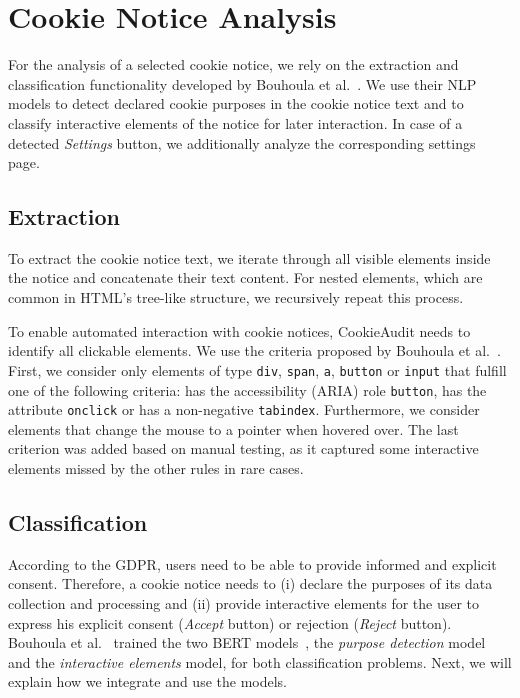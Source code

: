 \section{Cookie Notice Analysis}
For the analysis of a selected cookie notice, we rely on the extraction and classification functionality developed by Bouhoula et al.~\cite{bouhoula2023automated}.
We use their NLP models to detect declared cookie purposes in the cookie notice text and to classify interactive elements of the notice for later interaction.
In case of a detected \emph{Settings} button, we additionally analyze the corresponding settings page.

\subsection{Extraction} \label{subsec:extraction}
To extract the cookie notice text, we iterate through all visible elements inside the notice and concatenate their text content.
For nested elements, which are common in HTML's tree-like structure, we recursively repeat this process.

To enable automated interaction with cookie notices, CookieAudit needs to identify all clickable elements.
We use the criteria proposed by Bouhoula et al.~\cite{bouhoula2023automated}.
First, we consider only elements of type \texttt{div}, \texttt{span}, \texttt{a}, \texttt{button} or \texttt{input} that fulfill one of the following criteria: 
has the accessibility (ARIA) role \texttt{button}, 
has the attribute \texttt{onclick} or
has a non-negative \texttt{tabindex}.
Furthermore, we consider elements that change the mouse to a pointer when hovered over.
The last criterion was added based on manual testing, as it captured some interactive elements missed by the other rules in rare cases.

\subsection{Classification}
According to the GDPR, users need to be able to provide informed and explicit consent.
Therefore, a cookie notice needs to (i) declare the purposes of its data collection and processing and (ii) provide interactive elements for the user to express his explicit consent (\emph{Accept} button) or rejection (\emph{Reject} button).
Bouhoula et al.~\cite{bouhoula2023automated} trained the two BERT models~\cite{devlin2018bert}, the \emph{purpose detection} model and the \emph{interactive elements} model, for both classification problems.
Next, we will explain how we integrate and use the models.

